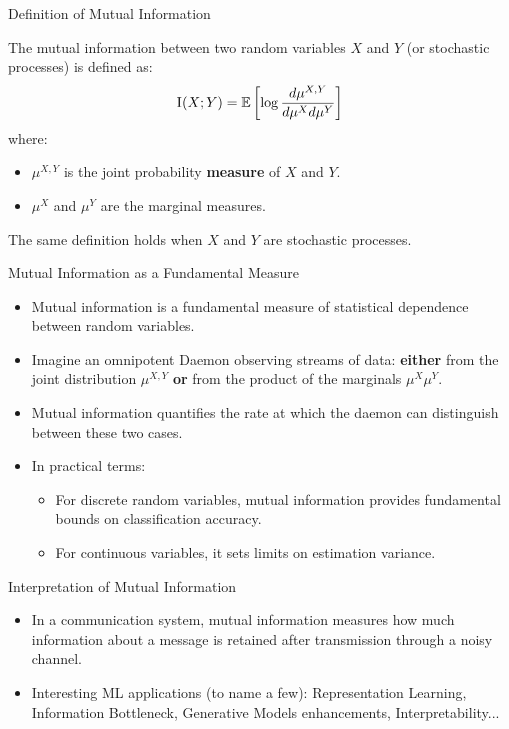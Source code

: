 \begin{frame}[allowframebreaks]{Definition of Mutual Information}
  
  The mutual information between two random variables $X$ and $Y$ (or stochastic processes) is defined as:
  \begin{equation}
    \textsc{I}(X; Y) = \mathbb{E} \left[ \log \frac{d\mu^{X,Y}}{d\mu^X d\mu^Y} \right]
  \end{equation}
  where:
  \begin{itemize}
    \item $\mu^{X,Y}$ is the joint probability \textbf{measure} of $X$ and $Y$.
    \item $\mu^X$ and $\mu^Y$ are the marginal measures.
  \end{itemize}
The same definition holds when $X$ and $Y$ are stochastic processes.

\framebreak



\end{frame}


\begin{frame}{Mutual Information as a Fundamental Measure}
  
  \begin{itemize}
    \item Mutual information is a fundamental measure of statistical dependence between random variables.
    \item Imagine an omnipotent Daemon observing streams of data: \textbf{either} from the joint distribution $\mu^{X,Y}$ \textbf{or} from the product of the marginals $\mu^X \mu^Y$.
    \item Mutual information quantifies the rate at which the daemon can distinguish between these two cases.
    \item In practical terms:
    \begin{itemize}
      \item For discrete random variables, mutual information provides fundamental bounds on classification accuracy.
      \item For continuous variables, it sets limits on estimation variance.
    \end{itemize}
  \end{itemize}
\end{frame}

\begin{frame}{Interpretation of Mutual Information}
  
  \begin{itemize}
    \item In a communication system, mutual information measures how much information about a message is retained after transmission through a noisy channel.
    \item Interesting ML applications (to name a few): Representation Learning, Information Bottleneck, Generative Models enhancements, Interpretability...
  \end{itemize}
\end{frame}



